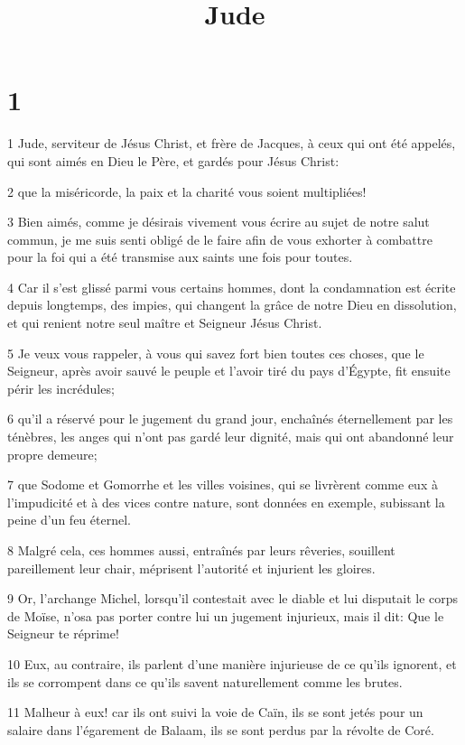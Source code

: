 

\title{Jude}


\chapter{1}

\par 1 Jude, serviteur de Jésus Christ, et frère de Jacques, à ceux qui ont été appelés, qui sont aimés en Dieu le Père, et gardés pour Jésus Christ:
\par 2 que la miséricorde, la paix et la charité vous soient multipliées!
\par 3 Bien aimés, comme je désirais vivement vous écrire au sujet de notre salut commun, je me suis senti obligé de le faire afin de vous exhorter à combattre pour la foi qui a été transmise aux saints une fois pour toutes.
\par 4 Car il s'est glissé parmi vous certains hommes, dont la condamnation est écrite depuis longtemps, des impies, qui changent la grâce de notre Dieu en dissolution, et qui renient notre seul maître et Seigneur Jésus Christ.
\par 5 Je veux vous rappeler, à vous qui savez fort bien toutes ces choses, que le Seigneur, après avoir sauvé le peuple et l'avoir tiré du pays d'Égypte, fit ensuite périr les incrédules;
\par 6 qu'il a réservé pour le jugement du grand jour, enchaînés éternellement par les ténèbres, les anges qui n'ont pas gardé leur dignité, mais qui ont abandonné leur propre demeure;
\par 7 que Sodome et Gomorrhe et les villes voisines, qui se livrèrent comme eux à l'impudicité et à des vices contre nature, sont données en exemple, subissant la peine d'un feu éternel.
\par 8 Malgré cela, ces hommes aussi, entraînés par leurs rêveries, souillent pareillement leur chair, méprisent l'autorité et injurient les gloires.
\par 9 Or, l'archange Michel, lorsqu'il contestait avec le diable et lui disputait le corps de Moïse, n'osa pas porter contre lui un jugement injurieux, mais il dit: Que le Seigneur te réprime!
\par 10 Eux, au contraire, ils parlent d'une manière injurieuse de ce qu'ils ignorent, et ils se corrompent dans ce qu'ils savent naturellement comme les brutes.
\par 11 Malheur à eux! car ils ont suivi la voie de Caïn, ils se sont jetés pour un salaire dans l'égarement de Balaam, ils se sont perdus par la révolte de Coré.
